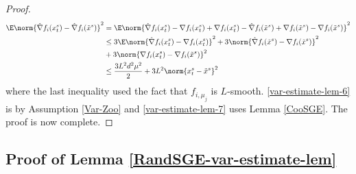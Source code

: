 \begin{proof}
  \begin{equation}
 \begin{split}
 \E \norm{\hat{\nabla} f_i(x_{t}^s)-\hat{\nabla} f_i(\tilde{x}^s)}^2 &= \E \norm{ \hat{\nabla} f_i(x_{t}^s)-{\nabla} f_i(x_{t}^s) + {\nabla} f_i(x_{t}^s)-\hat{\nabla} f_i(\tilde{x}^s)+{\nabla} f_i(\tilde{x}^s)-{\nabla} f_i(\tilde{x}^s)}^2\\
 &\leq 3 \E \norm{ \hat{\nabla} f_i(x_{t}^s)-{\nabla} f_i(x_{t}^s)}^2 + 3\norm{\hat{\nabla} f_i(\tilde{x}^s) - {\nabla} f_i(\tilde{x}^s)}^2\\
 &+ 3\norm{{\nabla} f_i(x_{t}^s) - {\nabla} f_i(\tilde{x}^s)}^2\\
 &\leq \frac{3 L^2 d^2 \mu^2}{2} + 3L^2 \norm{x_{t}^s-\tilde{x}^s}^2\\
 \end{split}
 \end{equation}
  where the last inequality used the fact that $f_{i,\mu_j}$ is $L$-smooth. \eqref{var-estimate-lem-6} is by Assumption \ref{Var-Zoo} and \eqref{var-estimate-lem-7} uses Lemma \ref{CooSGE}. The proof is now complete.
\end{proof}
\noindent\subsection{Proof of Lemma \ref{RandSGE-var-estimate-lem}}
